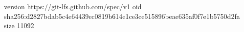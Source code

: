 version https://git-lfs.github.com/spec/v1
oid sha256:d2827bdab5c4e64439ec0819b614e1ce3ce515896beae635af0f7e1b5750d2fa
size 11092
